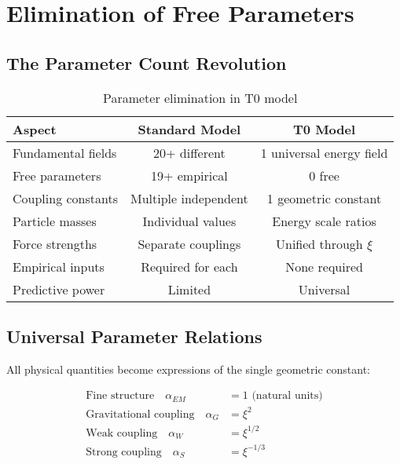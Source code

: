 \documentclass[12pt,a4paper]{report}
\begin{document}
\section{Elimination of Free Parameters}
\label{sec:elimination_free_parameters}

\subsection{The Parameter Count Revolution}
\label{subsec:parameter_count_revolution}

\begin{table}[htbp]
	\centering
	\begin{tabular}{lcc}
		\toprule
		\textbf{Aspect} & \textbf{Standard Model} & \textbf{T0 Model} \\
		\midrule
		Fundamental fields & 20+ different & 1 universal energy field \\
		Free parameters & 19+ empirical & 0 free \\
		Coupling constants & Multiple independent & 1 geometric constant \\
		Particle masses & Individual values & Energy scale ratios \\
		Force strengths & Separate couplings & Unified through $\xi$ \\
		Empirical inputs & Required for each & None required \\
		Predictive power & Limited & Universal \\
		\bottomrule
	\end{tabular}
	\caption{Parameter elimination in T0 model}
	\label{tab:parameter_elimination}
\end{table}

\subsection{Universal Parameter Relations}
\label{subsec:universal_parameter_relations}

All physical quantities become expressions of the single geometric constant:

\begin{align}
	\text{Fine structure} \quad \alpha_{EM} &= 1 \text{ (natural units)} \\
	\text{Gravitational coupling} \quad \alpha_G &= \xi^2 \\
	\text{Weak coupling} \quad \alpha_W &= \xi^{1/2} \\
	\text{Strong coupling} \quad \alpha_S &= \xi^{-1/3}
\end{align}
\end{document}
